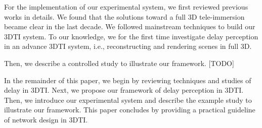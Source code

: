 For the implementation of our experimental system, we first reviewed previous works in details. We found that the solutions toward a full 3D tele-immersion became clear in the last decade. We followed mainstream techniques to build our 3DTI system. To our knowledge, we for the first time investigate delay perception in an advance 3DTI system, i.e., reconstructing and rendering scenes in full 3D.

Then, we describe a controlled study to illustrate our framework. [TODO]

In the remainder of this paper, we begin by reviewing techniques and studies of delay in 3DTI. Next, we propose our framework of delay perception in 3DTI. Then, we introduce our experimental system and describe the example study to illustrate our framework. This paper concludes by providing a practical guideline of network design in 3DTI.
